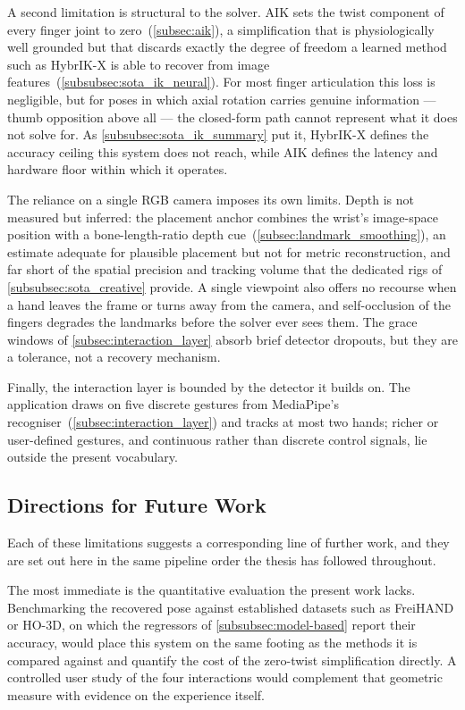 A second limitation is structural to the solver. AIK sets the twist component of every
finger joint to zero~(\autoref{subsec:aik}), a simplification that is physiologically
well grounded but that discards exactly the degree of freedom a learned method such as
HybrIK-X \cite{li2023hybrikx} is able to recover from image
features~(\autoref{subsubsec:sota_ik_neural}). For most finger articulation this loss
is negligible, but for poses in which axial rotation carries genuine information ---
thumb opposition above all --- the closed-form path cannot represent what it does not
solve for. As \autoref{subsubsec:sota_ik_summary} put it, HybrIK-X defines the accuracy
ceiling this system does not reach, while AIK defines the latency and hardware floor
within which it operates.

The reliance on a single RGB camera imposes its own limits. Depth is not measured but
inferred: the placement anchor combines the wrist's image-space position with a
bone-length-ratio depth cue~(\autoref{subsec:landmark_smoothing}), an estimate adequate
for plausible placement but not for metric reconstruction, and far short of the spatial
precision and tracking volume that the dedicated rigs of \autoref{subsubsec:sota_creative}
provide. A single viewpoint also offers no recourse when a hand leaves the frame or
turns away from the camera, and self-occlusion of the fingers degrades the landmarks
before the solver ever sees them. The grace windows of \autoref{subsec:interaction_layer}
absorb brief detector dropouts, but they are a tolerance, not a recovery mechanism.

Finally, the interaction layer is bounded by the detector it builds on. The application
draws on five discrete gestures from MediaPipe's recogniser~(\autoref{subsec:interaction_layer})
and tracks at most two hands; richer or user-defined gestures, and continuous rather
than discrete control signals, lie outside the present vocabulary.

\subsection{Directions for Future Work}\label{subsec:conclusion_future}

Each of these limitations suggests a corresponding line of further work, and they are
set out here in the same pipeline order the thesis has followed throughout.

The most immediate is the quantitative evaluation the present work lacks. Benchmarking
the recovered pose against established datasets such as FreiHAND or HO-3D, on which the
regressors of \autoref{subsubsec:model-based} report their accuracy, would place this
system on the same footing as the methods it is compared against and quantify the cost
of the zero-twist simplification directly. A controlled user study of the four
interactions would complement that geometric measure with evidence on the experience
itself.

